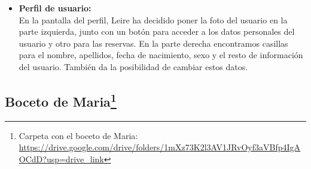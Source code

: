 \begin{itemize}
      \item\textbf{Perfil de usuario:} \\ En la pantalla del perfil, Leire ha decidido poner la foto del usuario en la parte izquierda, junto con un botón para acceder a los datos personales del usuario y otro para las reservas.
            En la parte derecha encontramos casillas para el nombre, apellidos, fecha de nacimiento, sexo y el resto de información del usuario. También da la posibilidad de cambiar estos datos.

\end{itemize}
\subsection[Boceto de Maria]{Boceto de Maria\footnote{Carpeta con el boceto de Maria: \url{https://drive.google.com/drive/folders/1mXz73K2l3AV1JRvOyf3aVBfp4IgAOCdD?usp=drive_link}}}

